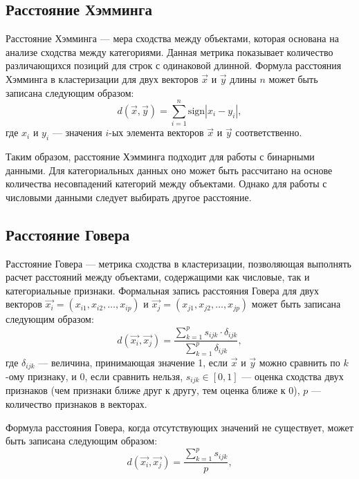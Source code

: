 \subsection{Расстояние Хэмминга}

Расстояние Хэмминга \cite{HammingDistance} --- мера сходства между объектами, которая основана на анализе сходства между категориями. Данная метрика показывает количество различающихся позиций для строк с одинаковой длинной.
Формула расстояния Хэмминга в кластеризации для двух векторов $\vec{x}$ и $\vec{y}$ длины $n$ может быть записана следующим образом:
\begin{equation}
    d(\vec{x},\vec{y}) = \sum_{i=1}^{n} \text{sign}|x_i - y_i|, 
\end{equation}
где $x_i$ и $y_i$ --- значения $i$-ых элемента векторов $\vec{x}$ и $\vec{y}$ соответственно. 

Таким образом, расстояние Хэмминга подходит для работы с бинарными данными. Для категориальных данных оно может быть рассчитано на основе количества несовпадений категорий между объектами. Однако для работы с числовыми данными следует выбирать другое расстояние.

\subsection{Расстояние Говера}

Расстояние Говера \cite{GowerDistance} --- метрика сходства в кластеризации, позволяющая выполнять расчет расстояний между объектами, содержащими как числовые, так и категориальные признаки.
Формальная запись расстояния Говера для двух векторов $\vec{x_i} = (x_{i1},x_{i2},\ldots,x_{ip})$ и $\vec{x_j} = (x_{j1},x_{j2},\ldots,x_{jp})$ может быть записана следующим образом:
\begin{equation}
    d(\vec{x_i},\vec{x_j}) = \frac{\sum_{k=1}^{p} s_{ijk} \cdot \delta_{ijk}}{\sum_{k=1}^{p} \delta_{ijk}}, 
\end{equation}
где $\delta_{ijk}$ --- величина, принимающая значение 1, если $\vec{x}$ и $\vec{y}$ можно сравнить по $k$-ому признаку, и 0, если сравнить нельзя, $s_{ijk} \in [0,1]$ --- оценка сходства двух признаков (чем признаки ближе друг к другу, тем оценка ближе к 0), $p$ --- количество признаков в векторах.

Формула расстояния Говера, когда отсутствующих значений не существует, может быть записана следующим образом:
\begin{equation}
    d(\vec{x_i},\vec{x_j}) = \frac{\sum_{k=1}^{p} s_{ijk}}{p},
\end{equation}

